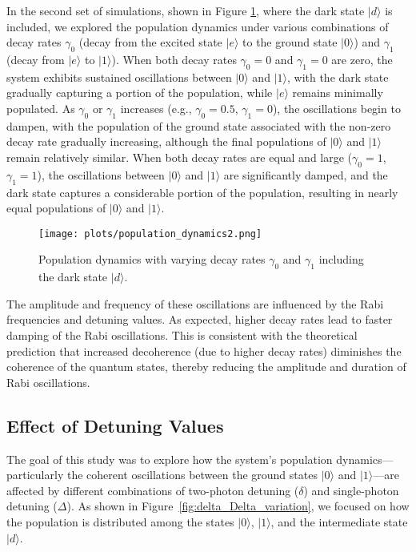 \documentclass{article}
\begin{document}
In the second set of simulations, shown in Figure \ref{fig:dark_state}, where the dark state \(|d\rangle\) is included, we explored the population dynamics under various combinations of decay rates \(\gamma_{0}\) (decay from the excited state \(|e\rangle\) to the ground state \(|0\rangle\)) and \(\gamma_{1}\) (decay from \(|e\rangle\) to \(|1\rangle\)). When both decay rates \(\gamma_{0} = 0\) and \(\gamma_{1} = 0\) are zero, the system exhibits sustained oscillations between \(|0\rangle\) and \(|1\rangle\), with the dark state gradually capturing a portion of the population, while \(|e\rangle\) remains minimally populated. As \(\gamma_{0}\) or \(\gamma_{1}\) increases (e.g., \(\gamma_{0} = 0.5\), \(\gamma_{1} = 0\)), the oscillations begin to dampen, with the population of the ground state associated with the non-zero decay rate gradually increasing, although the final populations of \(|0\rangle\) and \(|1\rangle\) remain relatively similar. When both decay rates are equal and large (\(\gamma_{0} = 1\), \(\gamma_{1} = 1\)), the oscillations between \(|0\rangle\) and \(|1\rangle\) are significantly damped, and the dark state captures a considerable portion of the population, resulting in nearly equal populations of \(|0\rangle\) and \(|1\rangle\).

\begin{figure}[h!]
    \centering
    \texttt{[image: plots/population\_dynamics2.png]}
    \caption{Population dynamics with varying decay rates \(\gamma_{0}\) and \(\gamma_{1}\) including the dark state \(|d\rangle\).}
    \label{fig:dark_state}
\end{figure}

The amplitude and frequency of these oscillations are influenced by the Rabi frequencies and detuning values. As expected, higher decay rates lead to faster damping of the Rabi oscillations. This is consistent with the theoretical prediction that increased decoherence (due to higher decay rates) diminishes the coherence of the quantum states, thereby reducing the amplitude and duration of Rabi oscillations.



\subsection{Effect of Detuning Values}


The goal of this study was to explore how the system's population dynamics—particularly the coherent oscillations between the ground states \(|0\rangle\) and \(|1\rangle\)—are affected by different combinations of two-photon detuning (\(\delta\)) and single-photon detuning (\(\Delta\)). As shown in Figure~\ref{fig:delta_Delta_variation}, we focused on how the population is distributed among the states \(|0\rangle\), \(|1\rangle\), and the intermediate state \(|d\rangle\).
\end{document}

